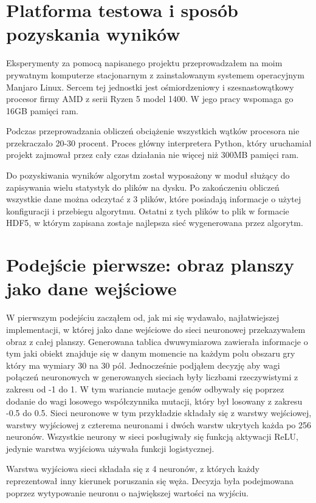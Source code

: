 \documentclass[12pt, oneside, a4paper]{report}
\begin{document}
\section{Platforma testowa i sposób pozyskania wyników}

Eksperymenty za pomocą napisanego projektu przeprowadzałem na moim prywatnym komputerze stacjonarnym z zainstalowanym systemem operacyjnym Manjaro Linux. Sercem tej jednostki jest ośmiordzeniowy i szesnastowątkowy procesor firmy AMD z serii Ryzen 5 model 1400. W jego pracy wspomaga go 16GB pamięci ram.

Podczas przeprowadzania obliczeń obciążenie wszystkich wątków procesora nie przekraczało 20-30 procent. Proces główny interpretera Python, który uruchamiał projekt zajmował przez cały czas działania nie więcej niż 300MB pamięci ram.

Do pozyskiwania wyników algorytm został wyposażony w moduł służący do zapisywania wielu statystyk do plików na dysku. Po zakończeniu obliczeń wszystkie dane można odczytać z 3 plików, które posiadają informacje o użytej konfiguracji i przebiegu algorytmu. Ostatni z tych plików to plik w formacie HDF5, w którym zapisana zostaje najlepsza sieć wygenerowana przez algorytm.

\section{Podejście pierwsze: obraz planszy jako dane wejściowe}

W pierwszym podejściu zacząłem od, jak mi się wydawało, najłatwiejszej implementacji, w której jako dane wejściowe do sieci neuronowej przekazywałem obraz z całej planszy. Generowana tablica dwuwymiarowa zawierała informacje o tym jaki obiekt znajduje się w danym momencie na każdym polu obszaru gry który ma wymiary 30 na 30 pól. Jednocześnie podjąłem decyzję aby wagi połączeń neuronowych w generowanych sieciach były liczbami rzeczywistymi z zakresu od -1 do 1. W tym wariancie mutacje genów odbywały się poprzez dodanie do wagi losowego współczynnika mutacji, który był losowany z zakresu -0.5 do 0.5. Sieci neuronowe w tym przykładzie składały się z warstwy wejściowej, warstwy wyjściowej z czterema neuronami i dwóch warstw ukrytych każda po 256 neuronów. Wszystkie neurony w sieci posługiwały się funkcją aktywacji ReLU, jedynie warstwa wyjściowa używała funkcji logistycznej.

Warstwa wyjściowa sieci składała się z 4 neuronów, z których każdy reprezentował inny kierunek poruszania się węża. Decyzja była podejmowana poprzez wytypowanie neuronu o największej wartości na wyjściu.
\end{document}
